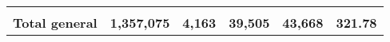 \begin{tabular}{lrcclr}
	& \multicolumn{1}{l}{}                                           & \multicolumn{1}{l}{}                                       & \multicolumn{1}{l}{} &                                                                     & \multicolumn{1}{l}{}                                                         \\
	\rowcolor[HTML]{DDEBF7} 
	\textbf{Total   general}                                       & \textbf{1,357,075}                                             & \multicolumn{1}{r}{\cellcolor[HTML]{DDEBF7}\textbf{4,163}} & \textbf{39,505}      & \textbf{43,668}                                                     & \textbf{321.78}                                                             
\end{tabular}